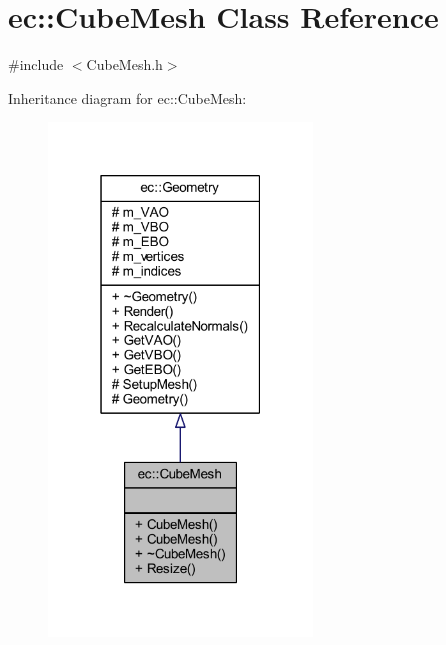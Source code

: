 \hypertarget{classec_1_1_cube_mesh}{}\section{ec\+:\+:Cube\+Mesh Class Reference}
\label{classec_1_1_cube_mesh}


{\ttfamily \#include $<$Cube\+Mesh.\+h$>$}



Inheritance diagram for ec\+:\+:Cube\+Mesh\+:
\nopagebreak
\begin{figure}[H]
\begin{center}
\leavevmode
\includegraphics[width=199pt]{classec_1_1_cube_mesh__inherit__graph}
\end{center}
\end{figure}


